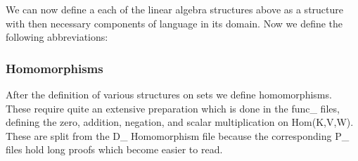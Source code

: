 \documentclass[11pt]{article}
\begin{document}
\begin{figure}[H]
\begin{center}
\end{center}
\end{figure}
We can now define a each of the linear algebra structures above as a structure with then necessary components of language in its domain. Now we define the following abbreviations:
\begin{figure}[H]
\centering
\begin{minipage}{.5\textwidth}
\end{minipage}%
\begin{minipage}{.5\textwidth}
\end{minipage}
\end{figure}

\subsubsection{Homomorphisms}

After the definition of various structures on sets we define homomorphisms. These require quite an extensive preparation which is done in the func\_ files, defining the zero, addition, negation, and scalar multiplication on Hom(K,V,W). These are split from the D\_ Homomorphism file because the corresponding P\_ files hold long proofs which become easier to read.
\end{document}
